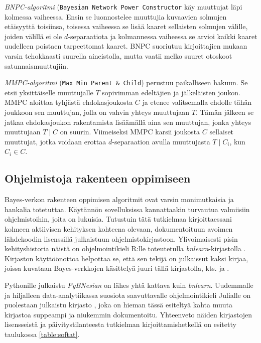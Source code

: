 \emph{BNPC-algoritmi} (\texttt{Bayesian Network Power Constructor}  \citep{natori_constraint-based_2015} käy muuttujat läpi kolmessa vaiheessa. Ensin se luonnostelee muuttujia kuvaavien solmujen etäisyyttä toisiinsa, toisessa vaiheessa se lisää kaaret sellaisten solmujen välille, joiden välillä ei ole $d$-separaatiota ja kolmannessa vaiheessa se arvioi kaikki kaaret uudelleen poistaen tarpeettomat kaaret. BNPC suoriutuu kirjoittajien mukaan varsin tehokkaasti suurella aineistolla, mutta vaatii melko suuret otoskoot satunnaismuuttujiin. 

\emph{MMPC-algoritmi} (\texttt{Max Min Parent \& Child}) \citep{tsamardinos_time_2003} perustuu paikalliseen hakuun. Se etsii yksittäiselle muuttujalle $T$ sopivimman edeltäjien ja jälkeläisten joukon. MMPC aloittaa tyhjästä ehdokasjoukosta $C$ ja etenee valitsemalla ehdolle tähän joukkoon sen muuttujan, jolla on vahvin yhteys muuttujaan $T$. Tämän jälkeen se jatkaa ehdokasjoukon rakentamista lisäämällä aina sen muuttujan, jonka yhteys muuttujaan $T \mid C$ on suurin. Viimeiseksi MMPC karsii joukosta $C$ sellaiset muuttujat, jotka voidaan erottaa $d$-separaation avulla muuttujasta $T \mid C_i$, kun $C_i \in C$.   

\subsection{Ohjelmistoja rakenteen oppimiseen} 

Bayes-verkon rakenteen oppimisen algoritmit ovat varsin monimutkaisia ja hankalia totetuttaa. Käytännön sovelluksissa kannattaakin turvautua valmiisiin ohjelmistoihin, joita on lukuisia. Tutustuin tätä tutkielmaa kirjoittaessani kolmeen aktiivisen kehityksen kohteena olevaan, dokumentoituun avoimen lähdekoodin lisenssillä julkaistuun ohjelmistokirjastoon. Ylivoimaisesti pisin kehityshistoria näistä on ohjelmointikieli R:lle toteutetulla \emph{bnlearn}-kirjastolla \citep{scutari_learning_2010}. Kirjaston käyttöönottoa helpottaa se, että sen tekijä on julkaissut kaksi kirjaa, joissa kuvataan Bayes-verkkojen käsittelyä juuri tällä kirjastolla, kts. \citet{nagarajan_bayesian_2013} ja \citet{R_bayesian_2014}.  

Pythonille julkaistu \emph{PyBNesian} \citep{atienza_pybnesian_2022} on lähes yhtä kattava kuin \emph{bnlearn}. Uudemmalle ja hiljalleen data-analytiikassa suosiota saavuttavalle ohjelmointikieli Julialle on puolestaan julkaistu kirjasto \citet{bayesnetsjl_2021}, joka on hieman tässä esiteltyä kahta muuta kirjastoa suppeampi ja niukemmin dokumentoitu. Yhteenveto näiden kirjastojen lisensseistä ja päivitystilanteesta tutkielman kirjoittamishetkellä on esitetty taulukossa \ref{table:softat}.   

